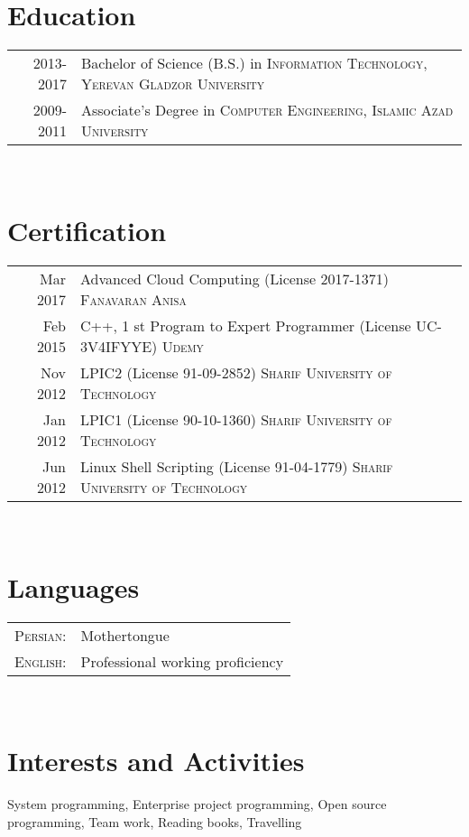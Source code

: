 \documentclass[a4paper,11pt]{article}
\begin{document}
\section{Education}
\begin{tabular}{rp{12cm}}

    \textsc{} 2013-2017 & Bachelor of Science (B.S.) in \textsc{Information Technology},
    \textsc{Yerevan Gladzor University}\\

    \textsc{} 2009-2011 & Associate’s Degree in \textsc{Computer Engineering},
    \textsc{Islamic Azad University}\\

\end{tabular}\\

\section{Certification}
\begin{tabular}{rp{12cm}}

    \textsc{} Mar 2017 & Advanced Cloud Computing (License 2017-1371) \textsc{Fanavaran Anisa}\\
    \textsc{} Feb 2015 & C++, 1 st Program to Expert Programmer (License UC-3V4IFYYE) \textsc{Udemy}\\
    \textsc{} Nov 2012 & LPIC2 (License 91-09-2852) \textsc{Sharif University of Technology}\\
    \textsc{} Jan 2012 & LPIC1 (License 90-10-1360) \textsc{Sharif University of Technology}\\
    \textsc{} Jun 2012 & Linux Shell Scripting (License 91-04-1779) \textsc{Sharif University of Technology}\\

\end{tabular}\\

\section{Languages}
\begin{tabular}{rl}

    \textsc{Persian:} & Mothertongue\\
    \textsc{English:} & Professional working proficiency\\

\end{tabular}\\

\section{Interests and Activities}

    System programming,
    Enterprise project programming,
    Open source programming,
    Team work,
    Reading books,
    Travelling
\end{document}
